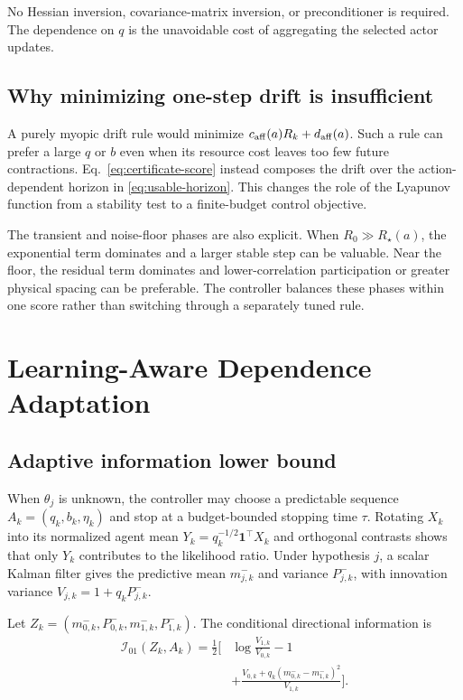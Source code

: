 \documentclass[journal]{IEEEtran}
\begin{document}
No Hessian inversion, covariance-matrix inversion, or preconditioner is required.
The dependence on $q$ is the unavoidable cost of aggregating the selected actor updates.

\subsection{Why minimizing one-step drift is insufficient}
A purely myopic drift rule would minimize $c_{\rm aff}(a)R_k+d_{\rm aff}(a)$.
Such a rule can prefer a large $q$ or $b$ even when its resource cost leaves too few future contractions.
Eq.~\eqref{eq:certificate-score} instead composes the drift over the action-dependent horizon in \eqref{eq:usable-horizon}.
This changes the role of the Lyapunov function from a stability test to a finite-budget control objective.

The transient and noise-floor phases are also explicit.
When $R_0\gg R_\star(a)$, the exponential term dominates and a larger stable step can be valuable.
Near the floor, the residual term dominates and lower-correlation participation or greater physical spacing can be preferable.
The controller balances these phases within one score rather than switching through a separately tuned rule.

\section{Learning-Aware Dependence Adaptation}
\subsection{Adaptive information lower bound}
When $\theta_j$ is unknown, the controller may choose a predictable sequence $A_k=(q_k,b_k,\eta_k)$ and stop at a budget-bounded stopping time $\tau$.
Rotating $X_k$ into its normalized agent mean $Y_k=q_k^{-1/2}\bm{1}^\top X_k$ and orthogonal contrasts shows that only $Y_k$ contributes to the likelihood ratio.
Under hypothesis $j$, a scalar Kalman filter gives the predictive mean $m^-_{j,k}$ and variance $P^-_{j,k}$, with innovation variance $V_{j,k}=1+q_kP^-_{j,k}$.

Let $Z_k=(m^-_{0,k},P^-_{0,k},m^-_{1,k},P^-_{1,k})$.
The conditional directional information is
\begin{equation}
\begin{aligned}
\mathcal{I}_{01}(Z_k,A_k)=\frac12\bigg[&\log\frac{V_{1,k}}{V_{0,k}}-1\\
&+\frac{V_{0,k}+q_k(m^-_{0,k}-m^-_{1,k})^2}{V_{1,k}}\bigg].
\end{aligned}
\label{eq:conditional-kl}
\end{equation}
\end{document}
